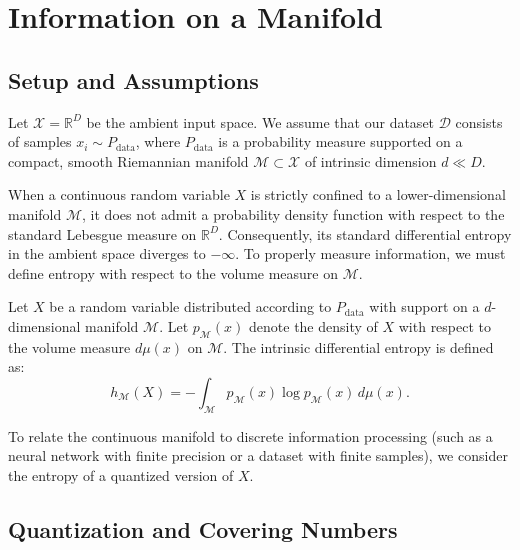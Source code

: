 \section{Information on a Manifold}

\subsection{Setup and Assumptions}

Let $\mathcal{X} = \mathbb{R}^D$ be the ambient input space. We assume that our dataset $\mathcal{D}$ consists of samples $x_i \sim P_{\text{data}}$, where $P_{\text{data}}$ is a probability measure supported on a compact, smooth Riemannian manifold $\mathcal{M} \subset \mathcal{X}$ of intrinsic dimension $d \ll D$. 

When a continuous random variable $X$ is strictly confined to a lower-dimensional manifold $\mathcal{M}$, it does not admit a probability density function with respect to the standard Lebesgue measure on $\mathbb{R}^D$. Consequently, its standard differential entropy in the ambient space diverges to $-\infty$. To properly measure information, we must define entropy with respect to the volume measure on $\mathcal{M}$.

\begin{definition}
Let $X$ be a random variable distributed according to $P_{\text{data}}$ with support on a $d$-dimensional manifold $\mathcal{M}$. Let $p_{\mathcal{M}}(x)$ denote the density of $X$ with respect to the volume measure $d\mu(x)$ on $\mathcal{M}$. The intrinsic differential entropy is defined as:
\begin{equation}
    h_{\mathcal{M}}(X) = - \int_{\mathcal{M}} p_{\mathcal{M}}(x) \log p_{\mathcal{M}}(x) \, d\mu(x).
\end{equation}
\end{definition}

To relate the continuous manifold to discrete information processing (such as a neural network with finite precision or a dataset with finite samples), we consider the entropy of a quantized version of $X$. 

\subsection{Quantization and Covering Numbers}

